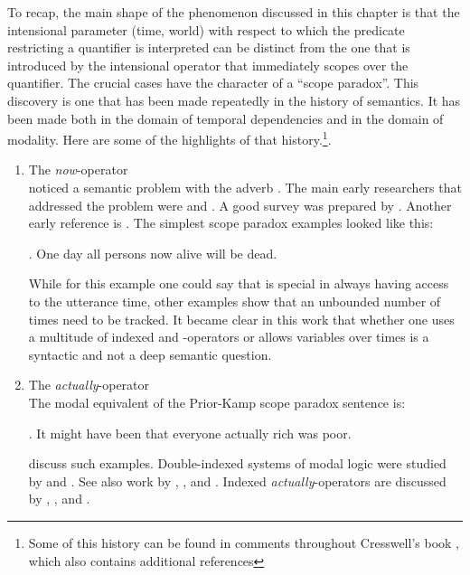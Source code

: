 To recap, the main shape of the phenomenon discussed in this chapter is that the intensional parameter (time, world) with respect to which the predicate restricting a quantifier is interpreted can be distinct from the one that is introduced by the intensional operator that immediately scopes over the quantifier. The crucial cases have the character of a ``scope paradox''. This discovery is one that has been made repeatedly in the history of semantics. It has been made both in the domain of temporal dependencies and in the domain of modality. Here are some of the highlights of that history.\footnote{Some of this history can be found in comments throughout Cresswell's book \citep{cresswell:entities}, which also contains additional references}.

\begin{enumerate}
  
  \item The \emph{now}-operator\\[6pt]
  \citet{prior:now} noticed a semantic problem with the adverb . The main early researchers that addressed the problem were \citet{kamp:now} and \citet{vlach:diss}. A good survey was prepared by \citet{vanbenthem:tenselogic}. Another early reference is \citet{saarinen:backward}. The simplest scope paradox examples looked like this:
  
  \ex. One day all persons now alive will be dead.
  
  While for this example one could say that  is special in always having access to the utterance time, other examples show that an unbounded number of times need to be tracked. It became clear in this work that whether one uses a multitude of indexed  and -operators or allows variables over times is a syntactic and not a deep semantic question.
  
  \medskip\item The \emph{actually}-operator\\[6pt]
  The modal equivalent of the Prior-Kamp scope paradox sentence is:
  
  \ex. It might have been that everyone actually rich was poor.
  
  \citet{crossley-humberstone} discuss such examples. Double-indexed systems of modal logic were studied by \citet{segerberg} and \citet{aqvist:1973:modal}. See also work by \citet{lewis:anselm}, \citet{vaninwagen:actuality}, and \citet{hazen:actuality}. Indexed \emph{actually}-operators are discussed by \citet{prior-fine}, \citet{peacocke:necessity}, and \citet{forbes:physicalism,forbes:metaphysics,forbes:possibility}.
  

\end{enumerate}
